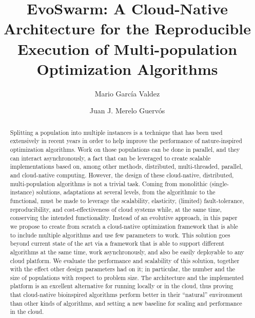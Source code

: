 \documentclass[review]{elsarticle}
\begin{document}
\lstset{language=Python} 
\begin{frontmatter}

  \title{EvoSwarm: A Cloud-Native Architecture for the Reproducible Execution of Multi-population Optimization Algorithms}
   
\author[itt]{Mario Garc\'ia Valdez}

\author[granada]{Juan J. Merelo Guerv\'os}

\address[itt]{Department of Graduate Studies, Instituto Tecnol\'ogico de Tijuana, Tijuana BC, Mexico}
\address[granada]{Department of Computer Architecture and Technology, Universidad de Granada, Granada, Spain}

\begin{abstract} 
Splitting a population into multiple instances is a technique that has
been used extensively in recent years in order to help improve the
performance of nature-inspired optimization algorithms. Work on those
populations can be done in parallel, and they can interact asynchronously,
a fact that can be leveraged to create scalable implementations based
on, among other methods, distributed, multi-threaded, parallel, and
cloud-native computing.  However, the design of these cloud-native,
distributed, multi-population algorithms is not a trivial task. Coming
from monolithic (single-instance) solutions, adaptations at several
levels, from the algorithmic to the functional, must be made to
leverage the scalability, elasticity, (limited) fault-tolerance,
reproducibility, and cost-effectiveness of cloud systems while, at the
same time, conserving the intended functionality. Instead of an
evolutive approach, in this paper we propose to create from scratch a
cloud-native optimization framework that is able to include multiple
algorithms and use few parameters to work. This solution goes beyond
current state of the art via a framework that is able to support
different algorithms at the same time, work asynchronously, and also
be easily deployable to any cloud platform. We evaluate the
performance and scalability of this solution, together with the effect
other design parameters had on it; in particular, the number and the
size of populations with respect to problem size. The architecture and
the implemented platform is an excellent alternative for running
locally or in the cloud, thus proving that cloud-native bioinspired
algorithms perform better in their ``natural'' environment than other
kinds of algorithms, %
and setting a new baseline for scaling and
performance in the cloud.
\end{abstract}


\end{frontmatter}
\end{document}
